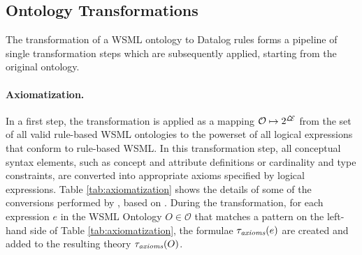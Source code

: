 \def\mvex{\ensuremath{E_x}}
\def\mvey{\ensuremath{E_y}}
\def\mvez{\ensuremath{E_z}}
\def\mve1{\ensuremath{E_1}}
\def\mven{\ensuremath{E_n}}

\subsection{Ontology Transformations}
The transformation of a WSML ontology to Datalog rules forms a
pipeline of single transformation steps which are subsequently
applied, starting from the original ontology.

\paragraph{Axiomatization.} In a first step, the transformation
\transax is applied as a mapping $\mathcal{O} \mapsto 2^{\mathcal{L\!E}}$ from
the set of all valid rule-based WSML ontologies to the powerset of
all logical expressions that conform to rule-based WSML. In this
transformation step, all conceptual syntax elements, such as
concept and attribute definitions or cardinality and type
constraints, are converted into appropriate axioms specified by
logical expressions. Table \ref{tab:axiomatization} shows the
details of some of the conversions performed by \transax, based on
\cite{wsml-spec}. During the transformation, for each expression
$e$ in the WSML Ontology $O \in \mathcal{O}$ that matches a
pattern on the left-hand side of Table \ref{tab:axiomatization},
the formulae $\tau_{\textit{\scriptsize{axioms}}}(e)$ are created and added to the resulting
theory $\tau_{\textit{\scriptsize{axioms}}}(O)$.

